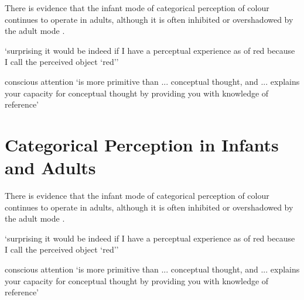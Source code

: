 \documentclass[12pt]{extarticle}
\begin{document}
\begin{multicols}{3}
There is evidence that the infant mode of categorical perception of colour continues to operate in adults, although it is often inhibited or overshadowed by the adult mode \citep{Gilbert:2006yb}.
 
‘surprising it would be indeed if I have a perceptual experience as of red because I call the perceived object ‘red’’
\citep[pp.\ 324--5]{Stokes:2006fd}
 
conscious attention ‘is more primitive than ... conceptual thought, and ... explains your capacity for conceptual thought by providing you with knowledge of reference’
\citep[p.\ 3]{Campbell:2002ge}
 
 
 
\section{Categorical Perception in Infants and Adults}
 
There is evidence that the infant mode of categorical perception of colour continues to operate in adults, although it is often inhibited or overshadowed by the adult mode \citep{Gilbert:2006yb}.
 
‘surprising it would be indeed if I have a perceptual experience as of red because I call the perceived object ‘red’’
\citep[pp.\ 324--5]{Stokes:2006fd}
 
conscious attention ‘is more primitive than ... conceptual thought, and ... explains your capacity for conceptual thought by providing you with knowledge of reference’
\citep[p.\ 3]{Campbell:2002ge}
 


 

 
\footnotesize 


\end{multicols}
\end{document}

